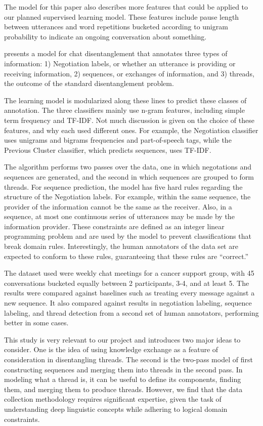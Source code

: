 \documentclass[11pt]{article}
\begin{document}
The model for this paper also describes more features that could be applied to
our planned supervised learning model. These features include pause length
between utterances and word repetitions bucketed according to unigram
probability to indicate an ongoing conversation about something.

\cite{Mayfield2012a} presents a model for chat disentanglement that annotates three types of
information: 1) Negotiation labels, or whether an utterance is providing or
receiving information, 2) sequences, or exchanges of information, and 3)
threads, the outcome of the standard disentanglement problem.

The learning model is modularized along these lines to predict these classes of
annotation. The three classifiers mainly use n-gram features, including simple
term frequency and TF-IDF. Not much discussion is given on the choice of these
features, and why each used different ones. For example, the Negotiation
classifier uses unigrams and bigrams frequencies and part-of-speech tags, while
the Previous Cluster classifier, which predicts sequences, uses TF-IDF. 

The algorithm performs two passes over the data, one in which negotations and
sequences are generated, and the second in which sequences are grouped to form
threads. For sequence prediction, the model has five hard rules regarding the
structure of the Negotiation labels. For example, within the same sequence, the
provider of the information cannot be the same as the receiver. Also, in a
sequence, at most one continuous series of utterances may be made by the
information provider. These constraints are defined as an integer linear
programming problem and are used by the model to prevent classifications that
break domain rules. Interestingly, the human annotators of the data set are
expected to conform to these rules, guaranteeing that these rules are
“correct.”

The dataset used were weekly chat meetings for a cancer support group, with 45
conversations bucketed equally between 2 participants, 3-4, and at least 5. The
results were compared against baselines such as treating every message against
a new sequence. It also compared against results in negotiation labeling,
sequence labeling, and thread detection from a second set of human annotators,
performing better in some cases.

This study is very relevant to our project and introduces two major ideas to
consider. One is the idea of using knowledge exchange as a feature of
consideration in disentangling threads. The second is the two-pass model of
first constructing sequences and merging them into threads in the second pass.
In modeling what a thread is, it can be useful to define its components,
finding them, and merging them to produce threads. However, we find that the
data collection methodology requires significant expertise, given the task of
understanding deep linguistic concepts while adhering to logical domain
constraints.
\end{document}
